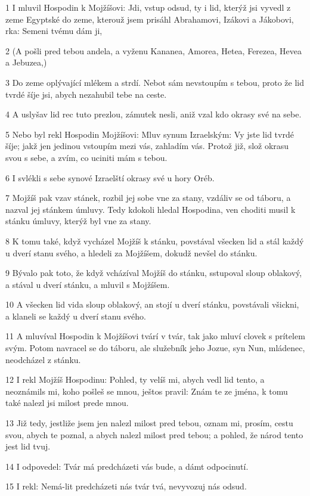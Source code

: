 \par 1 I mluvil Hospodin k Mojžíšovi: Jdi, vstup odsud, ty i lid, kterýž jsi vyvedl z zeme Egyptské do zeme, kterouž jsem prisáhl Abrahamovi, Izákovi a Jákobovi, rka: Semeni tvému dám ji,
\par 2 (A pošli pred tebou andela, a vyženu Kananea, Amorea, Hetea, Ferezea, Hevea a Jebuzea,)
\par 3 Do zeme oplývající mlékem a strdí. Nebot sám nevstoupím s tebou, proto že lid tvrdé šíje jsi, abych nezahubil tebe na ceste.
\par 4 A uslyšav lid rec tuto prezlou, zámutek nesli, aniž vzal kdo okrasy své na sebe.
\par 5 Nebo byl rekl Hospodin Mojžíšovi: Mluv synum Izraelským: Vy jste lid tvrdé šíje; jakž jen jedinou vstoupím mezi vás, zahladím vás. Protož již, slož okrasu svou s sebe, a zvím, co uciniti mám s tebou.
\par 6 I svlékli s sebe synové Izraelští okrasy své u hory Oréb.
\par 7 Mojžíš pak vzav stánek, rozbil jej sobe vne za stany, vzdáliv se od táboru, a nazval jej stánkem úmluvy. Tedy kdokoli hledal Hospodina, ven choditi musil k stánku úmluvy, kterýž byl vne za stany.
\par 8 K tomu také, když vycházel Mojžíš k stánku, povstával všecken lid a stál každý u dverí stanu svého, a hledeli za Mojžíšem, dokudž nevšel do stánku.
\par 9 Bývalo pak toto, že když vcházíval Mojžíš do stánku, sstupoval sloup oblakový, a stával u dverí stánku, a mluvil s Mojžíšem.
\par 10 A všecken lid vida sloup oblakový, an stojí u dverí stánku, povstávali všickni, a klaneli se každý u dverí stanu svého.
\par 11 A mluvíval Hospodin k Mojžíšovi tvárí v tvár, tak jako mluví clovek s prítelem svým. Potom navracel se do táboru, ale služebník jeho Jozue, syn Nun, mládenec, neodcházel z stánku.
\par 12 I rekl Mojžíš Hospodinu: Pohled, ty velíš mi, abych vedl lid tento, a neoznámils mi, koho pošleš se mnou, ještos pravil: Znám te ze jména, k tomu také nalezl jsi milost prede mnou.
\par 13 Již tedy, jestliže jsem jen nalezl milost pred tebou, oznam mi, prosím, cestu svou, abych te poznal, a abych nalezl milost pred tebou; a pohled, že národ tento jest lid tvuj.
\par 14 I odpovedel: Tvár má predcházeti vás bude, a dámt odpocinutí.
\par 15 I rekl: Nemá-lit predcházeti nás tvár tvá, nevyvozuj nás odsud.
